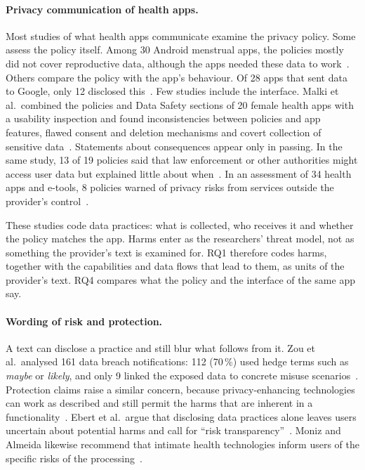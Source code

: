\paragraph{Privacy communication of health apps.} Most studies of what health
apps communicate examine the privacy policy. Some assess the policy itself.
Among 30 Android menstrual apps, the policies mostly did not cover
reproductive data, although the apps needed these data to
work~\parencite{shipp2020period}. Others compare the policy with the app's
behaviour. Of 28 apps that sent data to Google, only 12 disclosed
this~\parencite{huckvale2019assessment}. Few studies include the interface.
Malki et al.\ combined the policies and Data Safety sections of 20 female
health apps with a usability inspection and found inconsistencies between
policies and app features, flawed consent and deletion mechanisms and covert
collection of sensitive data~\parencite{malki2024exploring}. Statements about
consequences appear only in passing. In the same study, 13 of 19 policies said
that law enforcement or other authorities might access user data but explained
little about when~\parencite[\S4.2.5]{malki2024exploring}. In an assessment of
34 health apps and e-tools, 8 policies warned of privacy risks from services
outside the provider's control~\parencite{lamonica2021privacy}.

These studies code data practices: what is collected, who receives it and whether the
policy matches the app. Harms enter as the researchers' threat model, not as
something the provider's text is examined for. RQ1 therefore codes harms,
together with the capabilities and data flows that lead to them, as units of
the provider's text. RQ4 compares what the policy and the interface of the same
app say.

\paragraph{Wording of risk and protection.} A text can disclose a practice and
still blur what follows from it. Zou et al.\ analysed 161 data breach
notifications: 112 (70\,\%) used hedge terms such as \emph{maybe} or
\emph{likely}, and only 9 linked the exposed data to concrete misuse
scenarios~\parencite[\S5]{zou2019might}. Protection claims raise a similar
concern, because privacy-enhancing technologies can work as described and still
permit the harms that are inherent in a
functionality~\parencite{martin2025cookies,knabenhans2026harms}. Ebert et al.\
argue that disclosing data practices alone leaves users uncertain about
potential harms and call for \enquote{risk
transparency}~\parencite{ebert2026procedures}. Moniz and Almeida likewise
recommend that intimate health technologies inform users of the specific risks
of the processing~\parencite{moniz2025toward}.

